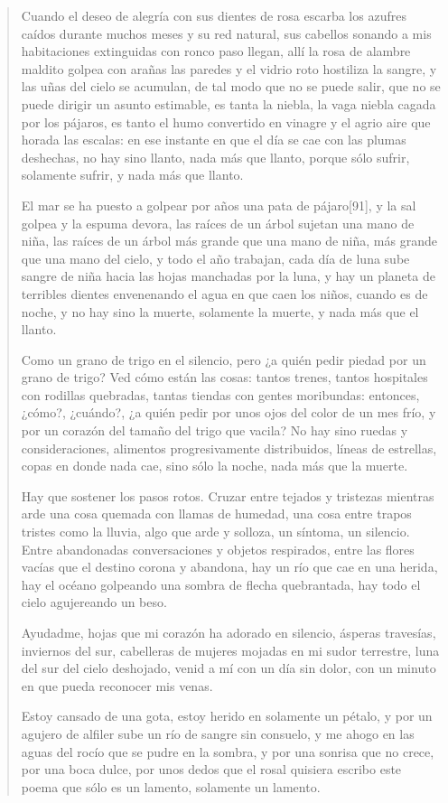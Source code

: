 \documentclass[12pt]{article}
\begin{document}
\clearpage
{}
\begin{verse}
Cuando el deseo de alegría con sus dientes de rosa
escarba los azufres caídos durante muchos meses
y su red natural, sus cabellos sonando
a mis habitaciones extinguidas con ronco paso llegan,
allí la rosa de alambre maldito
golpea con arañas las paredes
y el vidrio roto hostiliza la sangre,
y las uñas del cielo se acumulan,
de tal modo que no se puede salir, que no se puede dirigir
un asunto estimable,
es tanta la niebla, la vaga niebla cagada por los pájaros,
es tanto el humo convertido en vinagre
y el agrio aire que horada las escalas:
en ese instante en que el día se cae con las plumas deshechas,
no hay sino llanto, nada más que llanto,
porque sólo sufrir, solamente sufrir,
y nada más que llanto.

El mar se ha puesto a golpear por años una pata de pájaro[91],
y la sal golpea y la espuma devora,
las raíces de un árbol sujetan una mano de niña,
las raíces de un árbol más grande que una mano de niña,
más grande que una mano del cielo,
y todo el año trabajan, cada día de luna
sube sangre de niña hacia las hojas manchadas por la luna,
y hay un planeta de terribles dientes
envenenando el agua en que caen los niños,
cuando es de noche, y no hay sino la muerte,
solamente la muerte, y nada más que el llanto.

Como un grano de trigo en el silencio, pero
¿a quién pedir piedad por un grano de trigo?
Ved cómo están las cosas: tantos trenes,
tantos hospitales con rodillas quebradas,
tantas tiendas con gentes moribundas:
entonces, ¿cómo?, ¿cuándo?,
¿a quién pedir por unos ojos del color de un mes frío,
y por un corazón del tamaño del trigo que vacila?
No hay sino ruedas y consideraciones,
alimentos progresivamente distribuidos,
líneas de estrellas, copas
en donde nada cae, sino sólo la noche,
nada más que la muerte.

Hay que sostener los pasos rotos.
Cruzar entre tejados y tristezas mientras arde
una cosa quemada con llamas de humedad,
una cosa entre trapos tristes como la lluvia,
algo que arde y solloza,
un síntoma, un silencio.
Entre abandonadas conversaciones y objetos respirados,
entre las flores vacías que el destino corona y abandona,
hay un río que cae en una herida,
hay el océano golpeando una sombra de flecha quebrantada,
hay todo el cielo agujereando un beso.

Ayudadme, hojas que mi corazón ha adorado en silencio,
ásperas travesías, inviernos del sur, cabelleras
de mujeres mojadas en mi sudor terrestre,
luna del sur del cielo deshojado,
venid a mí con un día sin dolor,
con un minuto en que pueda reconocer mis venas.

Estoy cansado de una gota,
estoy herido en solamente un pétalo,
y por un agujero de alfiler sube un río de sangre sin consuelo,
y me ahogo en las aguas del rocío que se pudre en la sombra,
y por una sonrisa que no crece, por una boca dulce,
por unos dedos que el rosal quisiera
escribo este poema que sólo es un lamento,
solamente un lamento.

\end{verse}
\end{document}
